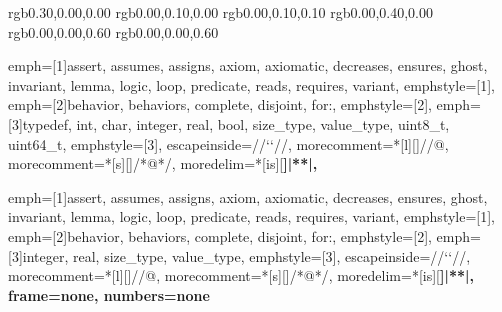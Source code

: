 
\usepackage{courier} 
\usepackage{listings}
\usepackage{color} 


\makeatletter
\renewcommand\lstinline[1][]{%
  \leavevmode\bgroup %
  \def\lst@boxpos{b}%
  \lsthk@PreSet\lstset{flexiblecolumns,#1}%
  \lsthk@TextStyle
  \ifnum\iffalse{\fi`}=\z@\fi
  \@ifnextchar\bgroup{%
  \ifnum`{=\z@}\fi%
  \afterassignment\lst@InlineG \let\@let@token}{%
  \ifnum`{=\z@}\fi\lstinline@}}
\makeatother


%\definecolor{darkred}		{rgb}{0.60,0.00,0.00}
\definecolor{coACSLBehavior}	{rgb}{0.30,0.00,0.00}
\definecolor{coASCL}		{rgb}{0.00,0.10,0.00}
\definecolor{coASCLKeyword}	{rgb}{0.00,0.10,0.10}
\definecolor{darkgreen}		{rgb}{0.00,0.40,0.00}
%\definecolor{red}		{rgb}{0.98,0.00,0.00}
\definecolor{darkblue}		{rgb}{0.00,0.00,0.60}
%\definecolor{lightblue}		{rgb}{0.60,0.80,1.00}
%\definecolor{lightred}		{rgb}{1.00,0.60,0.60}
\definecolor{coCKeyword}	{rgb}{0.00,0.00,0.60}

{	emph=[1]{assert, assumes, assigns, axiom, axiomatic, decreases, ensures,
                 ghost, invariant, lemma, logic, loop, predicate,
		 reads, requires, variant},
	emphstyle=[1]{\bfseries\color{coASCLKeyword}},
	emph=[2]{behavior, behaviors, complete, disjoint, for:},
	emphstyle=[2]{\bfseries\color{coACSLBehavior}},
	emph=[3]{typedef, int, char, integer, real, bool, size_type, value_type, uint8_t,  uint64_t},
	emphstyle=[3]{\bfseries\color{coCKeyword}},
	escapeinside={//`}{`//},
	morecomment=*[l][\color{coASCL}]{//@},
	morecomment=*[s][\color{coASCL}]{/*@}{*/},
	moredelim=*[is][\bfseries]{|*}{*|},
	}

{	emph=[1]{assert, assumes, assigns, axiom, axiomatic, decreases, ensures,
                 ghost, invariant, lemma, logic, loop, predicate,
		 reads, requires, variant},
	emphstyle=[1]{\bfseries\color{coASCLKeyword}},
	emph=[2]{behavior, behaviors, complete, disjoint, for:},
	emphstyle=[2]{\bfseries\color{coACSLBehavior}},
	emph=[3]{integer, real, size_type, value_type},
	emphstyle=[3]{\bfseries\color{coCKeyword}},
	escapeinside={//`}{`//},
	morecomment=*[l][\color{coASCL}]{//@},
	morecomment=*[s][\color{coASCL}]{/*@}{*/},
	moredelim=*[is][\bfseries]{|*}{*|},
    frame=none,
    numbers=none
	}

